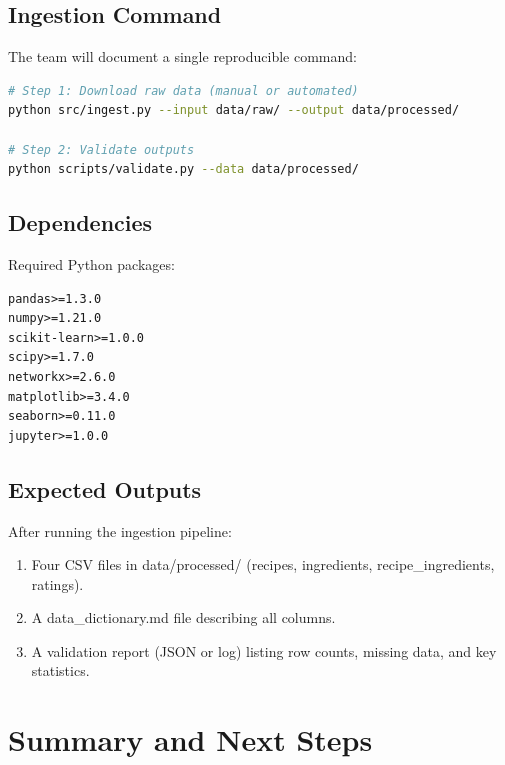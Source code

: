 \documentclass[11pt,a4paper]{article}
\begin{document}
\subsection{Ingestion Command}

The team will document a single reproducible command:

\begin{lstlisting}[language=bash]
# Step 1: Download raw data (manual or automated)
python src/ingest.py --input data/raw/ --output data/processed/

# Step 2: Validate outputs
python scripts/validate.py --data data/processed/
\end{lstlisting}

\subsection{Dependencies}

Required Python packages:

\begin{lstlisting}[caption=requirements.txt]
pandas>=1.3.0
numpy>=1.21.0
scikit-learn>=1.0.0
scipy>=1.7.0
networkx>=2.6.0
matplotlib>=3.4.0
seaborn>=0.11.0
jupyter>=1.0.0
\end{lstlisting}

\subsection{Expected Outputs}

After running the ingestion pipeline:

\begin{enumerate}
    \item Four CSV files in data/processed/ (recipes, ingredients, recipe\_ingredients, ratings).
    \item A data\_dictionary.md file describing all columns.
    \item A validation report (JSON or log) listing row counts, missing data, and key statistics.
\end{enumerate}

\newpage

\section{Summary and Next Steps}
\end{document}
